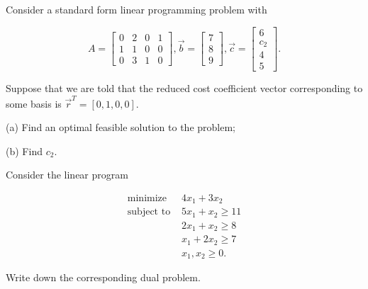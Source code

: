 \documentclass[12pt]{extarticle}
\theoremstyle{definition}
\begin{document}
\begin{problem} Consider a standard form linear programming problem with 

	\[A=\begin{bmatrix}
	0&2&0&1\\1&1&0&0\\0&3&1&0
	\end{bmatrix},\vec{b}=\begin{bmatrix}
	7\\8\\9
	\end{bmatrix},\vec{c}=\begin{bmatrix}
	6\\c_2\\4\\5
	\end{bmatrix}.\]

	Suppose that we are told that the reduced cost coefficient vector corresponding to some basis is $\vec{r}^T=[0,1,0,0]$.\\

	\begin{description}
		\item{(a)} Find an optimal feasible solution to the problem;\\
		\item{(b)} Find $c_2$.
	\end{description}

\end{problem}

\begin{problem} Consider the linear program

 \begin{align*}
\text{minimize } &4x_1+3x_2\\
\text{subject to } & 5x_1+x_2\geq 11\\
&2x_1+x_2\geq 8\\
&x_1+2x_2\geq 7\\
&x_1,x_2\geq 0.
\end{align*}

Write down the corresponding dual problem.

\end{problem}


\small


\end{document}

